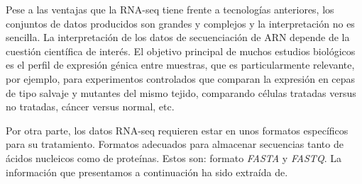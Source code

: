 
Pese a las ventajas que la RNA-seq tiene frente a tecnologías anteriores, los conjuntos de datos producidos son grandes y complejos y la interpretación
no es sencilla. La interpretación de los datos de secuenciación de ARN depende de la cuestión científica de interés. El objetivo principal de muchos 
estudios biológicos es el perfil de expresión génica entre muestras, que es particularmente relevante, por ejemplo, para experimentos controlados 
que comparan la expresión en cepas de tipo salvaje y mutantes del mismo tejido, comparando células tratadas versus no tratadas, cáncer versus normal, etc\cite{transcriptomics-2-RNA-seq-3}. \newline

Por otra parte, los datos RNA-seq requieren estar en unos formatos específicos para su tratamiento. Formatos adecuados para almacenar secuencias tanto
de ácidos nucleicos como de proteínas. Estos son: formato \textit{FASTA} y \textit{FASTQ}. La información que presentamos a continuación ha sido extraída de\cite{Ayala2023}.

